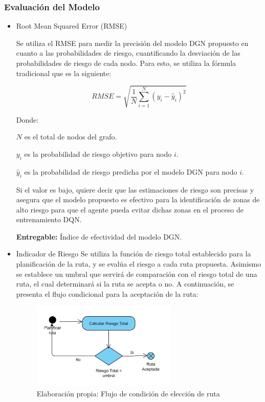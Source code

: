 \subsubsection{Evaluación del Modelo}
\begin{itemize}
	\item Root Mean Squared Error (RMSE)
	
	Se utiliza el RMSE para medir la precisión del modelo DGN propuesto en cuanto a las probabilidades de riesgo, cuantificando la desviación de las probabilidades de riesgo de cada nodo. Para esto, se utiliza la fórmula tradicional que es la siguiente:
	
\begin{equation} 
	RMSE = \sqrt{\frac{1}{N}\sum_{i=1}^{N}(y_{i}-\hat{y}_{i})^{2}}
\end{equation}
	
Donde:

$N$ es el total de nodos del grafo.

$y_{i}$ es la probabilidad de riesgo objetivo para nodo $i$.
	
$\hat{y}_{i}$ es la probabilidad de riesgo predicha por el modelo DGN para nodo $i$.
	
	Si el valor es bajo, quiere decir que las estimaciones de riesgo son precisas y asegura que el modelo propuesto es efectivo para la identificación de zonas de alto riesgo para que el agente pueda evitar dichas zonas en el proceso de entrenamiento DQN.
	
\textbf{Entregable:} Índice de efectividad del modelo DGN.
	\item Indicador de Riesgo
	Se utiliza la función de riesgo total establecido para la planificación de la ruta, y se evalúa el riesgo a cada ruta propuesta. Asimismo se establece un umbral que servirá de comparación con el riesgo total de una ruta, el cual determinará si la ruta se acepta o no. A continuación, se presenta el flujo condicional para la aceptación de la ruta:
	
	\begin{figure}[h]
		\begin{center}
			\includegraphics[width=0.65\textwidth]{3/figures/flujoCONDI.jpg}
			\caption[Elaboración propia: Flujo de condición de elección de ruta]{Elaboración propia: Flujo de condición de elección de ruta}
			\label{1:fig}
		\end{center}
	\end{figure}
	

\end{itemize}
